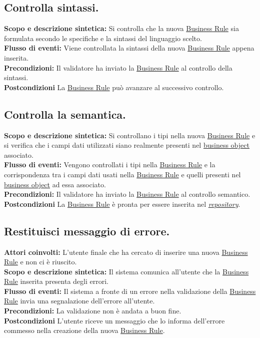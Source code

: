 \subsection{Controlla sintassi.}
\textbf{Scopo e descrizione sintetica:} Si controlla che la nuova \underline{Business Rule} sia formulata secondo le specifiche e la sintassi del linguaggio scelto.\\
\textbf{Flusso di eventi:} Viene controllata la sintassi della nuova \underline{Business Rule} appena inserita.\\
\textbf{Precondizioni:} Il validatore ha inviato la \underline{Business Rule} al controllo della sintassi.\\
\textbf{Postcondizioni} La \underline{Business Rule} pu\`o avanzare al successivo controllo.

\subsection{Controlla la semantica.}
\textbf{Scopo e descrizione sintetica:} Si controllano i tipi nella nuova \underline{Business Rule} e si verifica che i campi dati utilizzati siano realmente presenti nel \underline{business object} associato.\\
\textbf{Flusso di eventi:} Vengono controllati i tipi nella \underline{Business Rule} e la corrispondenza tra i campi dati usati nella \underline{Business Rule} e quelli presenti nel \underline{business object} ad essa associato.\\
\textbf{Precondizioni:} Il validatore ha inviato la \underline{Business Rule} al controllo semantico.\\
\textbf{Postcondizioni} La \underline{Business Rule} \`e pronta per essere inserita nel \textit{\underline{repository}}.

\subsection{Restituisci messaggio di errore.}
\textbf{Attori coinvolti:} L'utente finale che ha cercato di inserire una nuova \underline{Business Rule} e non ci \`e riuscito.\\
\textbf{Scopo e descrizione sintetica:} Il sistema comunica all'utente che la \underline{Business Rule} inserita presenta degli errori.\\
\textbf{Flusso di eventi:} Il sistema  a fronte di un errore nella validazione della \underline{Business Rule} invia una segnalazione dell'errore all'utente.\\
\textbf{Precondizioni:} La validazione non \`e andata a buon fine.\\
\textbf{Postcondizioni} L'utente riceve un messaggio che lo informa dell'errore commesso nella creazione della nuova \underline{Business Rule}.

